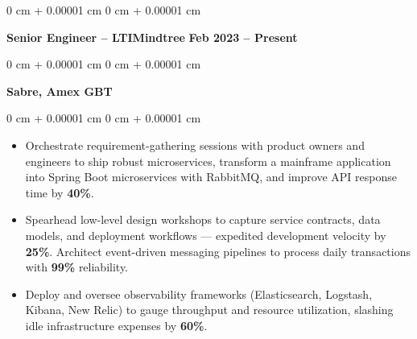 \documentclass[10pt, letterpaper]{article}
\newenvironment{highlights}{
    \begin{itemize}[
        topsep=0.10 cm,
        parsep=0.10 cm,
        partopsep=0pt,
        itemsep=0pt,
        leftmargin=0 cm + 10pt
    ]
}{
    \end{itemize}
} %
\newenvironment{onecolentry}{
    \begin{adjustwidth}{
        0 cm + 0.00001 cm
    }{
        0 cm + 0.00001 cm
    }
}{
    \end{adjustwidth}
} %
\newenvironment{twocolentry}[2][]{
    \onecolentry
    \def\secondColumn{#2}
    \setcolumnwidth{\fill, 4.5 cm}
    \begin{paracol}{2}
}{
    \switchcolumn \raggedleft \secondColumn
    \end{paracol}
    \endonecolentry
} %
\begin{document}
        \begin{twocolentry}{\textbf{Feb 2023 – Present}}
            \textbf{Senior Engineer – LTIMindtree} \end{twocolentry}
            \begin{onecolentry}
                \textbf{Sabre, Amex GBT}
            \end{onecolentry}
        \vspace{0.10 cm}
        \begin{onecolentry}
            \begin{highlights}
                \item Orchestrate requirement-gathering sessions with product owners and engineers to ship robust microservices, transform a mainframe application into Spring Boot microservices with RabbitMQ, and improve API response time by \textbf{40\%}.
                
                
                \item Spearhead low-level design workshops to capture service contracts, data models, and deployment workflows — expedited development velocity by \textbf{25\%}. Architect event-driven messaging pipelines to process daily transactions with \textbf{99\%} reliability. 

                \item Deploy and oversee observability frameworks (Elasticsearch, Logstash, Kibana, New Relic) to gauge throughput and resource utilization, slashing idle infrastructure expenses by \textbf{60\%}.

            \end{highlights}
        \end{onecolentry}
\end{document}

